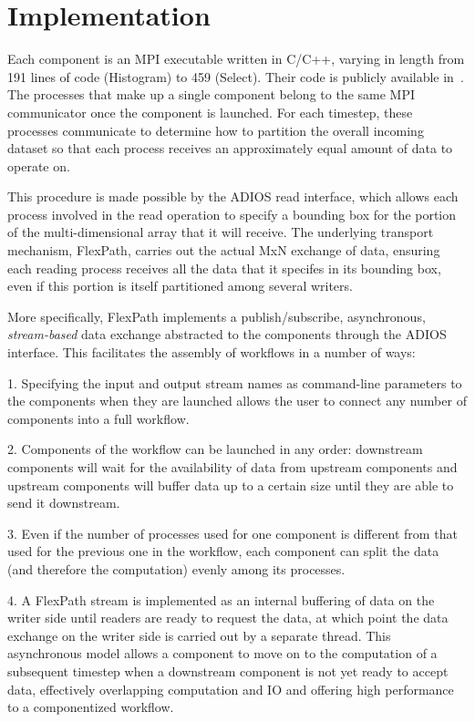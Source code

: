 \section{Implementation}
\label{s:impl}

Each component is an MPI executable
written in C/C++, varying in length from
191 lines of code (Histogram) to
459 (Select).
Their code is publicly available
in~\cite{champsaur:superglue-repo}.
The processes that make up a single
component belong to the same MPI communicator
once the component is launched.
For each timestep, these processes
communicate to determine how to partition
the overall incoming dataset so that each
process receives an approximately
equal amount of data to operate on.

This procedure is made possible by the ADIOS
read interface, which allows each process
involved in the read operation to specify a
bounding box for the portion of the multi-dimensional
array that it will receive.
The underlying transport mechanism, FlexPath,
carries out the actual MxN exchange of data,
ensuring each reading process receives
all the data that it specifes in its bounding box,
even if this portion is itself partitioned among several writers.

More specifically, FlexPath implements a publish/subscribe,
asynchronous, \textit{stream-based} data exchange abstracted to the
components through the ADIOS interface. This facilitates
the assembly of \sys workflows in a number of ways:

1. Specifying the input and output stream
names as command-line parameters to the \sys components 
when they are launched allows the user
to connect any number of components into
a full workflow.

2. Components of the workflow can be
launched in any order: downstream components
will wait for the availability of data from
upstream components and upstream
components will buffer data up to a certain
size until they are able to send it
downstream.

3. Even if the number of processes used for one
component is different from that used for the previous
one in the workflow, each component can split the data
(and therefore the computation) evenly among its processes.

4. A FlexPath stream is implemented as
an internal buffering of data on the writer side
until readers are ready to request the data,
at which point the data exchange
on the writer side is carried out
by a separate thread.
This asynchronous model allows a 
\sys component to move on to the computation
of a subsequent timestep when a downstream
component is not yet ready to accept data,
effectively overlapping computation and IO
and offering high performance to a componentized workflow.

